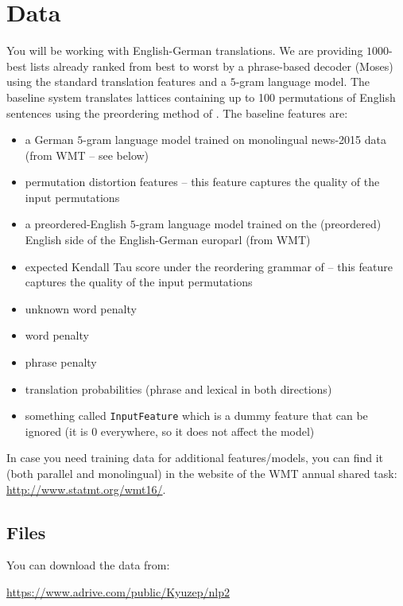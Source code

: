 \section{Data}

You will be working with English-German translations.
We are providing $1000$-best lists already ranked from best to worst by a phrase-based decoder (Moses) using the standard translation features and a $5$-gram language model.
The baseline system translates lattices containing up to 100 permutations of English sentences using the preordering method of \cite{Stanojevic+2015:RG}.
The baseline features are:

\begin{itemize}
    \item a German $5$-gram language model trained on monolingual news-2015 data (from WMT -- see below)
    \item permutation distortion features  -- this feature captures the quality of the input permutations
    \item a preordered-English $5$-gram language model trained on the (preordered) English side of the English-German europarl (from WMT)
    \item expected Kendall Tau score under the reordering grammar of \cite{Stanojevic+2015:RG} -- this feature captures the quality of the input permutations
    \item unknown word penalty
    \item word penalty
    \item phrase penalty
    \item translation probabilities (phrase and lexical in both directions)
    \item something called \texttt{InputFeature} which is a dummy feature that can be ignored (it is 0 everywhere, so it does not affect the model)
\end{itemize}


In case you need training data for additional features/models, you can find it (both parallel and monolingual) in the website of the WMT annual shared task: \url{http://www.statmt.org/wmt16/}.

\subsection{Files}

You can download the data from:

\begin{center}
\url{https://www.adrive.com/public/Kyuzep/nlp2}
\end{center}

